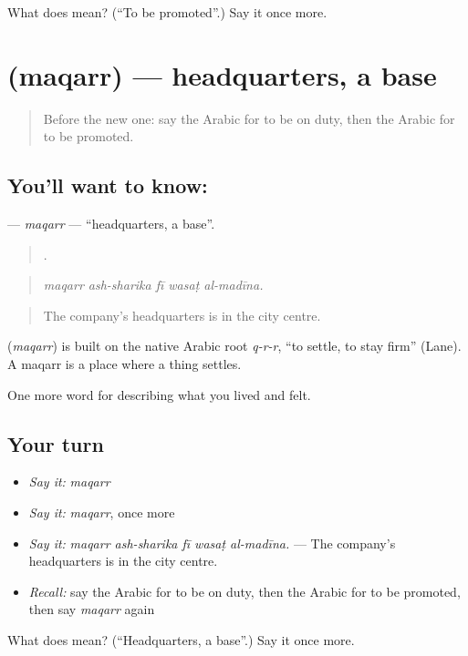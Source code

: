 \begin{tcolorbox}[breakable,colback=teal!4,colframe=teal!35!black,title={Before you move on}]
What does  mean? (\textquotedblleft{}To be promoted\textquotedblright{}.) Say it once more.
\end{tcolorbox}
\section[\texorpdfstring{\ar{مقر} (maqarr)}{مقر (maqarr)}]{ (maqarr) — headquarters, a base}

\label{lesson:AR-C524-maqarr}



\begin{quote}
Before the new one: say the Arabic for to be on duty, then the Arabic for to be promoted.
\end{quote}

\subsection*{You'll want to know: }
\textbf{} — \emph{maqarr} — \textquotedblleft{}headquarters, a base\textquotedblright{}.

\begin{quote}
    .
\end{quote}

\begin{quote}
\emph{maqarr ash-sharika fī wasaṭ al-madīna.}
\end{quote}

\begin{quote}
The company's headquarters is in the city centre.
\end{quote}

\begin{cousinweb}
\textbf{} (\emph{maqarr}) is built on the native Arabic root \emph{q-r-r}, \textquotedblleft{}to settle, to stay firm\textquotedblright{} (Lane). A maqarr is a place where a thing settles.
\end{cousinweb}

\begin{grammarlens}[title={What you've built}]
One more word for describing what you lived and felt.
\end{grammarlens}

\subsection*{Your turn}
\begin{itemize}
\raggedright
  \item \emph{Say it:} \emph{maqarr}
  \item \emph{Say it:} \emph{maqarr}, once more
  \item \emph{Say it:} \emph{maqarr ash-sharika fī wasaṭ al-madīna.} — The company's headquarters is in the city centre.
  \item \emph{Recall:} say the Arabic for to be on duty, then the Arabic for to be promoted, then say \emph{maqarr} again
\end{itemize}

\begin{tcolorbox}[breakable,colback=teal!4,colframe=teal!35!black,title={Before you move on}]
What does  mean? (\textquotedblleft{}Headquarters, a base\textquotedblright{}.) Say it once more.
\end{tcolorbox}
